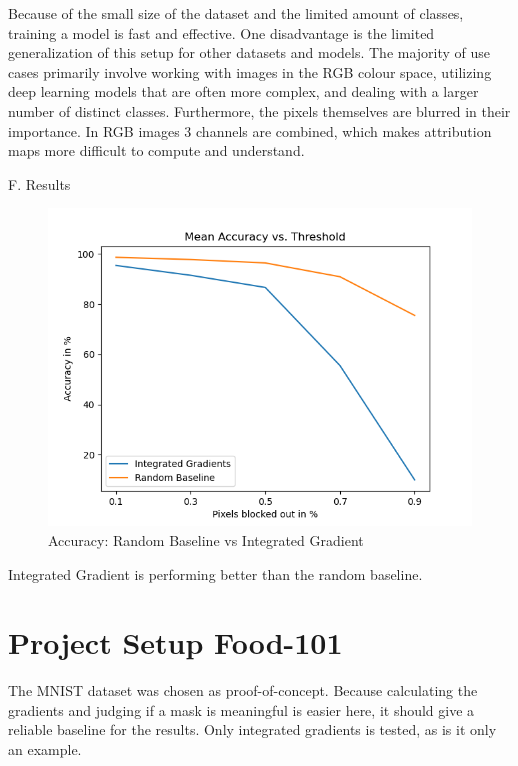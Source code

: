 Because of the small size of the dataset and the limited amount of classes, training a model is fast and effective. One disadvantage is the limited generalization of this setup for other datasets and models. The majority of use cases primarily involve working with images in the RGB colour space, utilizing deep learning models that are often more complex, and dealing with a larger number of distinct classes. Furthermore, the pixels themselves are blurred in their importance. In RGB images 3 channels are combined, which makes attribution maps more difficult to compute and understand.

F. Results

\begin{figure}[h!]
	\centering
	\includegraphics[width=150mm]{figs/mean_accuracy_vs_threshold}
	\caption{Accuracy: Random Baseline vs Integrated Gradient}
	\label{fig:Accuracy}
	
\end{figure}

Integrated Gradient is performing better than the random baseline.


\section{Project Setup Food-101}

The MNIST dataset \cite{deng2012mnist} was chosen as proof-of-concept. Because calculating the gradients and judging if a mask is meaningful is easier here, it should give a reliable baseline for the results. Only integrated gradients is tested, as is it only an example. 

